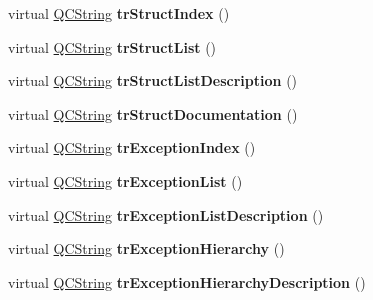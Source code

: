 \begin{DoxyCompactItemize}
\mbox{\label{class_translator_spanish_a1f31a58fbd24ec81a7604173c0019fd7}} 
virtual \mbox{\hyperlink{class_q_c_string}{Q\+C\+String}} {\bfseries tr\+Struct\+Index} ()
\item 
\mbox{\label{class_translator_spanish_a4d767e9216f16fc8c8a675c68e8727e0}} 
virtual \mbox{\hyperlink{class_q_c_string}{Q\+C\+String}} {\bfseries tr\+Struct\+List} ()
\item 
\mbox{\label{class_translator_spanish_a4d5cdc1d182e0b7a6afa5ee452f5c7fc}} 
virtual \mbox{\hyperlink{class_q_c_string}{Q\+C\+String}} {\bfseries tr\+Struct\+List\+Description} ()
\item 
\mbox{\label{class_translator_spanish_abe62b8a30e6d4a28f611ead3ff5b92dd}} 
virtual \mbox{\hyperlink{class_q_c_string}{Q\+C\+String}} {\bfseries tr\+Struct\+Documentation} ()
\item 
\mbox{\label{class_translator_spanish_a4c38456bf3d3c811df39e02e0a758f1f}} 
virtual \mbox{\hyperlink{class_q_c_string}{Q\+C\+String}} {\bfseries tr\+Exception\+Index} ()
\item 
\mbox{\label{class_translator_spanish_a9586ef08fa4aac32b2532d13c24279ce}} 
virtual \mbox{\hyperlink{class_q_c_string}{Q\+C\+String}} {\bfseries tr\+Exception\+List} ()
\item 
\mbox{\label{class_translator_spanish_a6555b97ebad04846cab00600d4672015}} 
virtual \mbox{\hyperlink{class_q_c_string}{Q\+C\+String}} {\bfseries tr\+Exception\+List\+Description} ()
\item 
\mbox{\label{class_translator_spanish_a7cf5d41412c97adecadaa9797ebf8e14}} 
virtual \mbox{\hyperlink{class_q_c_string}{Q\+C\+String}} {\bfseries tr\+Exception\+Hierarchy} ()
\item 
\mbox{\label{class_translator_spanish_af11fbe4d274630723c54eba86b2386f4}} 
virtual \mbox{\hyperlink{class_q_c_string}{Q\+C\+String}} {\bfseries tr\+Exception\+Hierarchy\+Description} ()
\item 

\end{DoxyCompactItemize}
